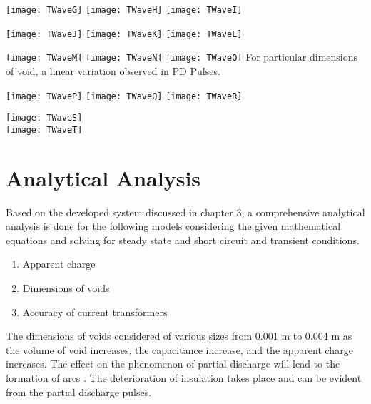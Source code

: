\pagebreak
\begin{center}
\texttt{[image: TWaveG]}
\vfill
\texttt{[image: TWaveH]}
\vfill
\texttt{[image: TWaveI]}
\end{center}

\pagebreak
\begin{center}
\texttt{[image: TWaveJ]}
\vfill
\texttt{[image: TWaveK]}
\vfill
\texttt{[image: TWaveL]}
\end{center}

\pagebreak
\begin{center}
\texttt{[image: TWaveM]}
\vfill
\texttt{[image: TWaveN]}
\vfill
\texttt{[image: TWaveO]}
\vfill
For particular dimensions of void, a linear variation observed in PD Pulses.
\end{center}

\pagebreak
\begin{center}
\texttt{[image: TWaveP]}
\vfill
\texttt{[image: TWaveQ]}
\vfill
\texttt{[image: TWaveR]}
\end{center}

\pagebreak
\begin{center}
\texttt{[image: TWaveS]}\\
\vspace*{1in}
\texttt{[image: TWaveT]}
\end{center}

\pagebreak
\section{Analytical Analysis}
Based on the developed system discussed in chapter 3, a comprehensive analytical analysis is done for the following models considering the given mathematical equations and solving for steady state and short circuit and transient conditions\setlength{\parskip}{1em}.

\begin{enumerate}
\item Apparent charge 
\item Dimensions of voids
\item Accuracy of current transformers
\end{enumerate}

The dimensions of voids considered of various sizes from 0.001 m to 0.004 m as the volume of void increases, the capacitance increase, and the apparent charge increases. The effect on the phenomenon of partial discharge will lead to the formation of arcs . The deterioration of insulation takes place and can be evident from the partial discharge pulses.

